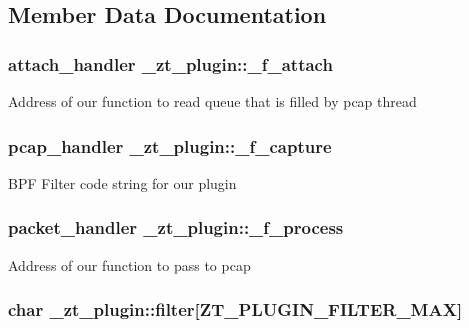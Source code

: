 \subsection{Member Data Documentation}
\hypertarget{struct__zt__plugin_ab646717ba0f01fb4aee918e7d5246c51}{
\subsubsection[{\-\_\-f\-\_\-attach}]{\setlength{\rightskip}{0pt plus 5cm}attach\-\_\-handler \-\_\-zt\-\_\-plugin\-::\-\_\-f\-\_\-attach}}\label{struct__zt__plugin_ab646717ba0f01fb4aee918e7d5246c51}
Address of our function to read queue that is filled by pcap thread \hypertarget{struct__zt__plugin_ae71982396032d7e0f8326ed7885d1656}{
\subsubsection[{\-\_\-f\-\_\-capture}]{\setlength{\rightskip}{0pt plus 5cm}pcap\-\_\-handler \-\_\-zt\-\_\-plugin\-::\-\_\-f\-\_\-capture}}\label{struct__zt__plugin_ae71982396032d7e0f8326ed7885d1656}
B\-P\-F Filter code string for our plugin \hypertarget{struct__zt__plugin_af170e5b42e6100cd381a616437e4b1c4}{
\subsubsection[{\-\_\-f\-\_\-process}]{\setlength{\rightskip}{0pt plus 5cm}packet\-\_\-handler \-\_\-zt\-\_\-plugin\-::\-\_\-f\-\_\-process}}\label{struct__zt__plugin_af170e5b42e6100cd381a616437e4b1c4}
Address of our function to pass to pcap \hypertarget{struct__zt__plugin_a2951bf9c0af74765eddda67233ac1d60}{
\subsubsection[{filter}]{\setlength{\rightskip}{0pt plus 5cm}char \-\_\-zt\-\_\-plugin\-::filter\mbox{[}Z\-T\-\_\-\-P\-L\-U\-G\-I\-N\-\_\-\-F\-I\-L\-T\-E\-R\-\_\-\-M\-A\-X\mbox{]}}}\label{struct__zt__plugin_a2951bf9c0af74765eddda67233ac1d60}
